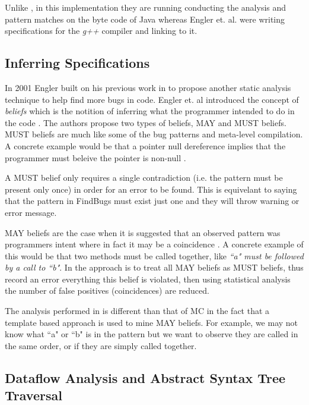 \documentclass[10pt,oneside]{IEEEtran}
\begin{document}

Unlike \cite{5}, in this implementation they are running conducting the analysis and pattern matches on the byte code of Java whereas Engler et. al. were writing specifications for the \textit{g++} compiler and linking to it.
\subsection{Inferring Specifications}
In 2001 Engler built on his previous work in \cite{5} to propose another static analysis technique to help find more bugs in code. Engler et. al introduced the concept of \textit{beliefs} which is the notition of inferring what the programmer intended to do in the code \cite{7}. The authors propose two types of beliefs, MAY and MUST beliefs. MUST beliefs are much like some of the bug patterns and meta-level compilation. A concrete example would be that a pointer null dereference implies that the programmer must beleive the pointer is non-null \cite{7}.

A MUST belief only requires a single contradiction (i.e. the pattern must be present only once) in order for an error to be found. This is equivelant to saying that the pattern in FindBugs must exist just one and they will throw warning or error message.

MAY beliefs are the case when it is suggested that an observed pattern was programmers intent where in fact it may be a coincidence \cite{7}. A concrete example of this would be that two methods must be called together, like \textit{``a" must be followed by a call to ``b"}. In \cite{7} the approach is to treat all MAY beliefs as MUST beliefs, thus record an error everything this belief is violated, then using statistical analysis the number of false positives (coincidences) are reduced.

The analysis performed in \cite{7} is different than that of MC in the fact that a template based approach is used to mine MAY beliefs. For example, we may not know what ``a" or ``b" is in the pattern but we want to observe they are called in the same order, or if they are simply called together.

\subsection{Dataflow Analysis and Abstract Syntax Tree Traversal}
\end{document}

